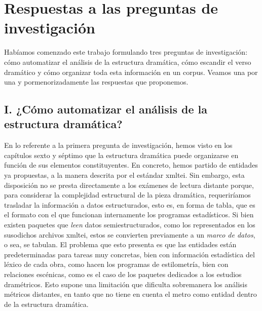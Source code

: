 \section{Respuestas a las preguntas de investigación}
Habíamos comenzado este trabajo formulando tres preguntas de investigación: cómo automatizar el análisis de la estructura dramática, cómo escandir el verso dramático y cómo organizar toda esta información en un corpus. Veamos una por una y pormenorizadamente las respuestas que proponemos.

\subsection{I. ¿Cómo automatizar el análisis de la estructura dramática?}
En lo referente a la primera pregunta de investigación, hemos visto en los capítulos sexto y séptimo que la estructura dramática puede organizarse en función de sus elementos constituyentes. En concreto, hemos partido de entidades ya propuestas, a la manera descrita por el estándar \ac{xmltei}. Sin embargo, esta disposición no se presta directamente a los exámenes de lectura distante porque, para considerar la complejidad estructural de la pieza dramática, requeriríamos trasladar la información a datos estructurados, esto es, en forma de tabla, que es el formato con el que funcionan internamente los programas estadísticos. Si bien existen paquetes que \textit{leen} datos semiestructurados, como los representados en los susodichos archivos \ac{xmltei}, estos se convierten previamente a un \textit{marco de datos}, o sea, se tabulan. El problema que esto presenta es que las entidades están predeterminadas para tareas muy concretas, bien con información estadística del léxico de cada obra, como hacen los programas de estilometría, bien con relaciones escénicas, como es el caso de los paquetes dedicados a los estudios dramétricos. Esto supone una limitación  que dificulta sobremanera los análisis métricos distantes, en tanto que no tiene en cuenta el metro como entidad dentro de la estructura dramática. 

